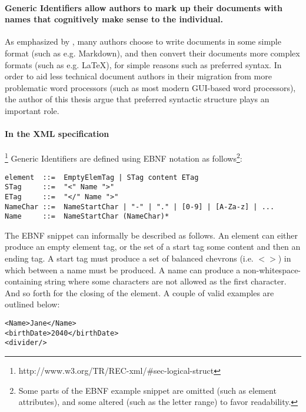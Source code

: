 \documentclass{scrreprt}
\begin{document}
\paragraph{Generic Identifiers allow authors to mark up their documents with names that cognitively make sense to the individual.} As emphasized by \citet{krijnen}, many authors choose to write documents in some simple format (such as e.g. Markdown), and then convert their documents more complex formats (such as e.g. \LaTeX{}), for simple reasons such as preferred syntax. In order to aid less technical document authors in their migration from more problematic word processors (such as most modern GUI-based word processors), the author of this thesis argue that preferred syntactic structure plays an important role.

\paragraph{In the XML specification}\footnote{http://www.w3.org/TR/REC-xml/\#sec-logical-struct} Generic Identifiers are defined using EBNF notation as follows\footnote{Some parts of the EBNF example snippet are omitted (such as element attributes), and some altered (such as the letter range) to favor readability.}:

\begin{lstlisting}
element  ::=  EmptyElemTag | STag content ETag
STag     ::=  "<" Name ">"
ETag     ::=  "</" Name ">"
NameChar ::=  NameStartChar | "-" | "." | [0-9] | [A-Za-z] | ...
Name     ::=  NameStartChar (NameChar)*
\end{lstlisting}

The EBNF snippet can informally be described as follows. An element can either produce an empty element tag, or the set of a start tag some content and then an ending tag. A start tag must produce a set of balanced chevrons (i.e. $<>$) in which between a name must be produced. A name can produce a non-whitespace-containing string where some characters are not allowed as the first character. And so forth for the closing of the element. A couple of valid examples are outlined below:

\begin{lstlisting}
<Name>Jane</Name>
<birthDate>2040</birthDate>
<divider/>
\end{lstlisting}
\end{document}
